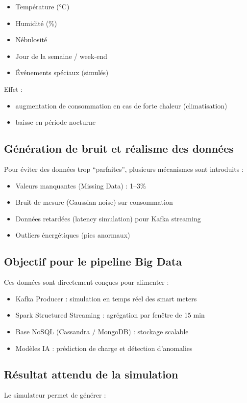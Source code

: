 \documentclass[12pt,a4paper]{report}
\begin{document}
\begin{itemize}
\item Température (°C)
\item Humidité (\%)
\item Nébulosité
\item Jour de la semaine / week-end
\item Événements spéciaux (simulés)
\end{itemize}

Effet :
\begin{itemize}
\item augmentation de consommation en cas de forte chaleur (climatisation)
\item baisse en période nocturne
\end{itemize}

\subsection{Génération de bruit et réalisme des données}
Pour éviter des données trop “parfaites”, plusieurs mécanismes sont introduits :

\begin{itemize}
\item Valeurs manquantes (Missing Data) : 1–3\%
\item Bruit de mesure (Gaussian noise) sur consommation
\item Données retardées (latency simulation) pour Kafka streaming
\item Outliers énergétiques (pics anormaux)
\end{itemize}

\subsection{Objectif pour le pipeline Big Data}
Ces données sont directement conçues pour alimenter :

\begin{itemize}
\item Kafka Producer : simulation en temps réel des smart meters
\item Spark Structured Streaming : agrégation par fenêtre de 15 min
\item Base NoSQL (Cassandra / MongoDB) : stockage scalable
\item Modèles IA : prédiction de charge et détection d’anomalies
\end{itemize}

\subsection{Résultat attendu de la simulation}
Le simulateur permet de générer :
\end{document}

